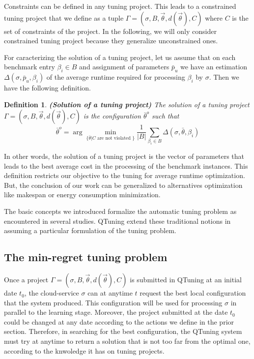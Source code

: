 \documentclass[10pt, conference, compsocconf]{IEEEtran}
\newtheorem{definition}[theorem]{Definition}
\begin{document}
Constraints can be defined in any tuning project. This leads to a constrained tuning project that we define 
 as a tuple $ \Gamma = (\sigma, B, \vec{\theta}, d(\vec{\theta}), C)$ where $C$ is the set of constraints of the project. 
In the following, we will only consider constrained tuning project because they generalize unconstrained ones. 


For caracterizing the solution of a tuning project, let us assume that on each benchmark entry $\beta_i \in B$ 
and assignment of parameters $\bar{p}_u$ we have an estimation $\Delta(\sigma, \bar{p}_u, \beta_i)$ of the 
average runtime required for processing $\beta_i$ by $\sigma$. Then we have the following definition.

\begin{definition}{\bf (Solution of a tuning project)}
The solution of a tuning project $ \Gamma = (\sigma, B, \vec{\theta}, d(\vec{\theta}), C)$  is the configuration 
$\bar{\theta}^o$ such that \[ \bar{\theta}^o = \arg \underset{\{\bar{\theta} | C \text{ are not violated }\}}{\min} \frac{1}{|B|}\sum_{\beta_i \in B} \Delta(\sigma, \bar{\theta}, \beta_i) \] 
\end{definition}

In other words, the solution of a tuning project is the vector of parameters that leads to the best average 
cost in the processing of the benchmark instances. This definition restricts our objective to the tuning for average runtime 
optimization. But, the conclusion of our work can be generalized to alternatives optimization like makespan or energy 
consumption minimization.  

The basic concepts we introduced formalize the automatic tuning problem as encountered in several studies. 
QTuning extend these traditional notions in assuming a particular formulation of the tuning problem. 

\subsection{The min-regret tuning problem}

Once a project $ \Gamma = (\sigma, B, \vec{\theta}, d(\vec{\theta}), C)$ is submitted in QTuning at an initial 
date $t_0$, the cloud-service $\sigma$ can at anytime $t$ request the best local configuration that the 
system produced. This configuration will be used for processing $\sigma$ in parallel to the  learning stage. 
Moreover, the project submitted at the date $t_0$ could be changed at any date according to the actions we define 
in the prior section. Therefore, in searching for the best configuration, the QTuning system must try at anytime 
to return a solution that is not too far from the optimal one, according to the knwoledge it has on tuning projects. 
\end{document}
